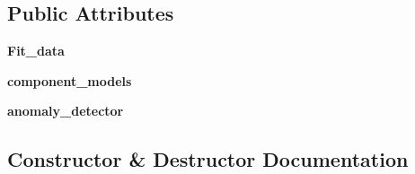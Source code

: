 \subsection*{Public Attributes}
\begin{DoxyCompactItemize}
\item 
{\bfseries Fit\+\_\+data}\hypertarget{classSAD_1_1Point__AnomalyDetector_1_1PyiscAnomalyScorer_1_1PyiscAnomalyScorer_a48edccc0d69161cf1e0787ea9597d9d6}{}\label{classSAD_1_1Point__AnomalyDetector_1_1PyiscAnomalyScorer_1_1PyiscAnomalyScorer_a48edccc0d69161cf1e0787ea9597d9d6}

\item 
{\bfseries component\+\_\+models}\hypertarget{classSAD_1_1Point__AnomalyDetector_1_1PyiscAnomalyScorer_1_1PyiscAnomalyScorer_ab0acbf34c58d6323750d493b75b85e6f}{}\label{classSAD_1_1Point__AnomalyDetector_1_1PyiscAnomalyScorer_1_1PyiscAnomalyScorer_ab0acbf34c58d6323750d493b75b85e6f}

\item 
{\bfseries anomaly\+\_\+detector}\hypertarget{classSAD_1_1Point__AnomalyDetector_1_1PyiscAnomalyScorer_1_1PyiscAnomalyScorer_a02bf85ed18cc5781410c7ca6ae0a3328}{}\label{classSAD_1_1Point__AnomalyDetector_1_1PyiscAnomalyScorer_1_1PyiscAnomalyScorer_a02bf85ed18cc5781410c7ca6ae0a3328}

\end{DoxyCompactItemize}


\subsection{Constructor \& Destructor Documentation}
